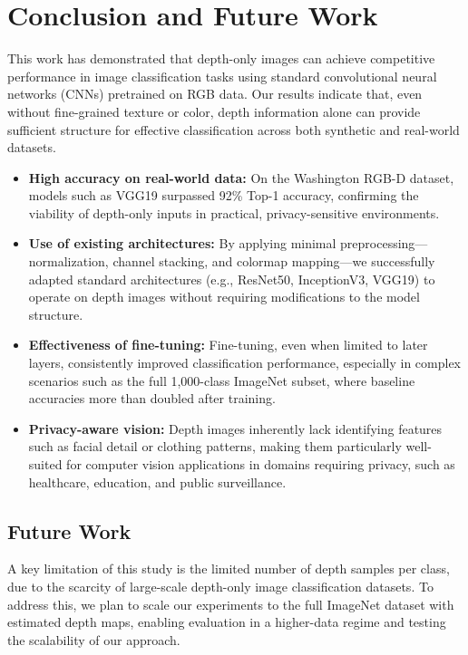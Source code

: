 \section{Conclusion and Future Work}

This work has demonstrated that depth-only images can achieve competitive performance in image classification tasks using standard convolutional neural networks (CNNs) pretrained on RGB data. Our results indicate that, even without fine-grained texture or color, depth information alone can provide sufficient structure for effective classification across both synthetic and real-world datasets.

\begin{itemize}
    \item \textbf{High accuracy on real-world data:} On the Washington RGB-D dataset, models such as VGG19 surpassed 92\% Top-1 accuracy, confirming the viability of depth-only inputs in practical, privacy-sensitive environments.
    
    \item \textbf{Use of existing architectures:} By applying minimal preprocessing—normalization, channel stacking, and colormap mapping—we successfully adapted standard architectures (e.g., ResNet50, InceptionV3, VGG19) to operate on depth images without requiring modifications to the model structure.
    
    \item \textbf{Effectiveness of fine-tuning:} Fine-tuning, even when limited to later layers, consistently improved classification performance, especially in complex scenarios such as the full 1,000-class ImageNet subset, where baseline accuracies more than doubled after training.
    
    \item \textbf{Privacy-aware vision:} Depth images inherently lack identifying features such as facial detail or clothing patterns, making them particularly well-suited for computer vision applications in domains requiring privacy, such as healthcare, education, and public surveillance.
\end{itemize}

\subsection{Future Work}
A key limitation of this study is the limited number of depth samples per class, due to the scarcity of large-scale depth-only image classification datasets. To address this, we plan to scale our experiments to the full ImageNet dataset with estimated depth maps, enabling evaluation in a higher-data regime and testing the scalability of our approach.

